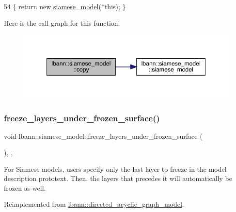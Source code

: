 \begin{DoxyCode}
54 \{ \textcolor{keywordflow}{return} \textcolor{keyword}{new} \hyperlink{classlbann_1_1siamese__model_af8ca6d6da679f39489f0c50b62ad0069}{siamese\_model}(*\textcolor{keyword}{this}); \}
\end{DoxyCode}
Here is the call graph for this function\+:\nopagebreak
\begin{figure}[H]
\begin{center}
\leavevmode
\includegraphics[width=348pt]{classlbann_1_1siamese__model_a26bbedec5306e47e214124cca2cb381b_cgraph}
\end{center}
\end{figure}
\mbox{\label{classlbann_1_1siamese__model_a3960a32fd45059516f3acb41549e1e92}} 
\subsubsection{\texorpdfstring{freeze\+\_\+layers\+\_\+under\+\_\+frozen\+\_\+surface()}{freeze\_layers\_under\_frozen\_surface()}}
{\footnotesize\ttfamily void lbann\+::siamese\+\_\+model\+::freeze\+\_\+layers\+\_\+under\+\_\+frozen\+\_\+surface (\begin{DoxyParamCaption}{ }\end{DoxyParamCaption})\hspace{0.3cm}{\ttfamily [override]}, {\ttfamily [protected]}, {\ttfamily [virtual]}}

For Siamese models, users specify only the last layer to freeze in the model description prototext. Then, the layers that precedes it will automatically be frozen as well. 

Reimplemented from \hyperlink{classlbann_1_1directed__acyclic__graph__model_a9f2a6e9472235ec91c5a50356471b3cb}{lbann\+::directed\+\_\+acyclic\+\_\+graph\+\_\+model}.



